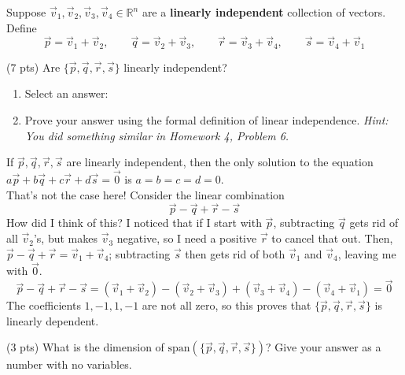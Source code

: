 \documentclass[11pt]{article}
\begin{document}
\newpage

\newpage

\begin{prob}[(10 pts)]
Suppose $\vec v_1,\vec v_2,\vec v_3,\vec v_4\in\mathbb R^n$ are a \textbf{linearly independent} collection of vectors. Define
\[
\vec p=\vec v_1+\vec v_2,\qquad
\vec q=\vec v_2+\vec v_3,\qquad
\vec r=\vec v_3+\vec v_4,\qquad
\vec s=\vec v_4+\vec v_1
\]

\begin{subprob}(7 pts) Are $\{\vec p,\vec q,\vec r,\vec s\}$ linearly independent?

\begin{enumerate}[label=(\roman*)]
    \item Select an answer:  
    \item Prove your answer using the formal definition of linear independence. \textit{Hint: You did something similar in Homework 4, Problem 6.} \\
    \emptybox{14cm}
\end{enumerate}

\begin{solution}
If $\vec p,\vec q,\vec r,\vec s$ are linearly independent, then the only solution to the equation $a \vec p + b \vec q + c \vec r + d \vec s = \vec 0$ is $a = b = c = d = 0$. \\

That's not the case here! Consider the linear combination
\[
\vec p-\vec q+\vec r-\vec s
\]
How did I think of this? I noticed that if I start with $\vec p$, subtracting $\vec q$ gets rid of all $\vec v_2$'s, but makes $\vec v_3$ negative, so I need a positive $\vec r$ to cancel that out. Then, $\vec p - \vec q + \vec r = \vec v_1 + \vec v_4$; subtracting $\vec s$ then gets rid of both $\vec v_1$ and $\vec v_4$, leaving me with $\vec 0$. \\
\[
\vec p - \vec q + \vec r - \vec s = (\vec v_1+\vec v_2)-(\vec v_2+\vec v_3)+(\vec v_3+\vec v_4)-(\vec v_4+\vec v_1)=\vec 0
\]
The coefficients $1,-1,1,-1$ are not all zero, so this proves that $\{\vec p,\vec q,\vec r,\vec s\}$ is linearly dependent.
\end{solution}
\end{subprob}

\begin{subprob}(3 pts) What is the dimension of $\text{span}(\{\vec p,\vec q,\vec r,\vec s\})$? Give your answer as a number with no variables. \\


\end{subprob}
\end{prob}
\end{document}
